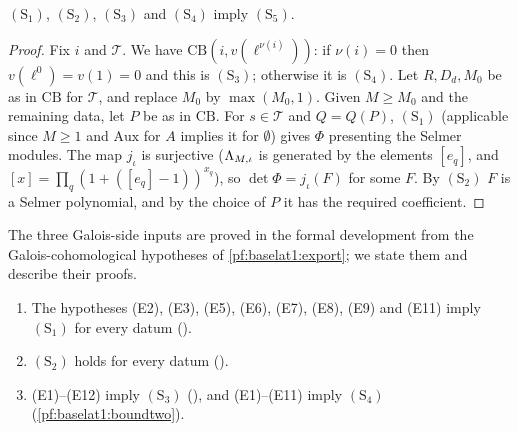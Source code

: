 \begin{proposition}\label{pf:baselat1:auxprimes}
$(\mathrm{S}_1)$, $(\mathrm{S}_2)$, $(\mathrm{S}_3)$ and $(\mathrm{S}_4)$ imply
$(\mathrm{S}_5)$.
\end{proposition}

\begin{proof}
Fix $i$ and $\mathcal T$. We have $\mathrm{CB}(i,v(\ell^{\nu(i)}))$: if $\nu(i)=0$ then
$v(\ell^0)=v(1)=0$ and this is $(\mathrm{S}_3)$; otherwise it is $(\mathrm{S}_4)$. Let $R,D_d,M_0$ be
as in $\mathrm{CB}$ for $\mathcal T$, and replace $M_0$ by $\max(M_0,1)$. Given $M\ge M_0$ and the remaining data,
let $P$ be as in $\mathrm{CB}$. For $s\in\mathcal T$ and $Q=Q(P)$, $(\mathrm{S}_1)$ (applicable since
$M\ge1$ and $\mathrm{Aux}$ for $A$ implies it for $\emptyset$) gives $\Phi$ presenting the Selmer modules. The map
$j_\iota$ is surjective ($\Lambda_{M,\iota}$ is generated by the elements $[e_q]$, and
$[x]=\prod_q(1+([e_q]-1))^{x_q}$), so $\det\Phi=j_\iota(F)$ for some $F$. By
$(\mathrm{S}_2)$ $F$ is a Selmer polynomial, and by the choice of $P$ it has the required
coefficient.
\end{proof}

The three Galois-side inputs are proved in the formal development from the Galois-cohomological hypotheses
of \cref{pf:baselat1:export}; we state them and describe their proofs.

\begin{theorem}\label{pf:baselat1:galinputs}
\begin{enumerate}[label=(\roman*)]
\item The hypotheses (E2), (E3), (E5),
  (E6), (E7), (E8), (E9) and
  (E11) imply $(\mathrm{S}_1)$ for every datum
  \textup{()}.
\item $(\mathrm{S}_2)$ holds for every datum
  \textup{()}.
\item (E1)--(E12) imply $(\mathrm{S}_3)$
  \textup{()}, and (E1)--(E11) imply
  $(\mathrm{S}_4)$ (\cref{pf:baselat1:boundtwo}).
\end{enumerate}
\end{theorem}

